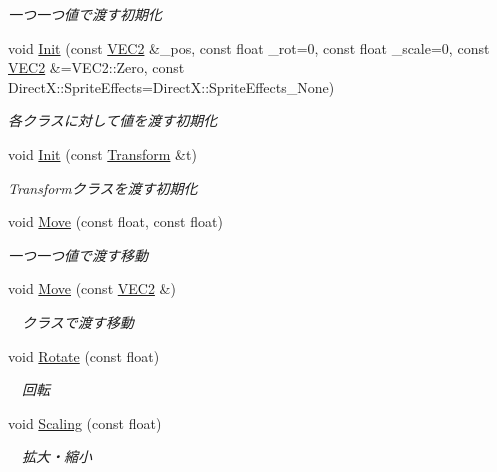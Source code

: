 \begin{DoxyCompactItemize}
\begin{DoxyCompactList}\small\item\em 一つ一つ値で渡す初期化 \end{DoxyCompactList}\item 
void \mbox{\hyperlink{class_transform_a9f05c957bb87a0e838c3499df19edaa2}{Init}} (const \mbox{\hyperlink{common_8h_afb0c5e21d4133ff4f200992c0b534e1b}{V\+E\+C2}} \&\+\_\+pos, const float \+\_\+rot=0, const float \+\_\+scale=0, const \mbox{\hyperlink{common_8h_afb0c5e21d4133ff4f200992c0b534e1b}{V\+E\+C2}} \&=V\+E\+C2\+::\+Zero, const Direct\+X\+::\+Sprite\+Effects=Direct\+X\+::\+Sprite\+Effects\+\_\+\+None)
\begin{DoxyCompactList}\small\item\em 各クラスに対して値を渡す初期化 \end{DoxyCompactList}\item 
void \mbox{\hyperlink{class_transform_a2d0cb73aca3f73de81f2bf8463cdb942}{Init}} (const \mbox{\hyperlink{class_transform}{Transform}} \&t)
\begin{DoxyCompactList}\small\item\em Transformクラスを渡す初期化 \end{DoxyCompactList}\item 
void \mbox{\hyperlink{class_transform_a45772ecb47b60d5b3f110613c3f15984}{Move}} (const float, const float)
\begin{DoxyCompactList}\small\item\em 一つ一つ値で渡す移動 \end{DoxyCompactList}\item 
void \mbox{\hyperlink{class_transform_a13dbb800ca989856d1f56c03dd9a0ad0}{Move}} (const \mbox{\hyperlink{common_8h_afb0c5e21d4133ff4f200992c0b534e1b}{V\+E\+C2}} \&)
\begin{DoxyCompactList}\small\item\em 　クラスで渡す移動 \end{DoxyCompactList}\item 
void \mbox{\hyperlink{class_transform_a696d7e837eafa09409150fb055daa223}{Rotate}} (const float)
\begin{DoxyCompactList}\small\item\em 　回転 \end{DoxyCompactList}\item 
void \mbox{\hyperlink{class_transform_ad6097ddf1d30f5a1023725efbee375fb}{Scaling}} (const float)
\begin{DoxyCompactList}\small\item\em 　拡大・縮小 \end{DoxyCompactList}\item 

\end{DoxyCompactItemize}

